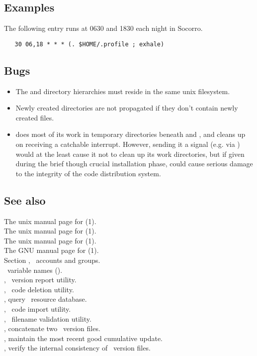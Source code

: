 \subsection*{Examples}

The following   entry runs  at 0630
and 1830 each night in Socorro.

\begin{verbatim}
   30 06,18 * * * (. $HOME/.profile ; exhale)
\end{verbatim}

\subsection*{Bugs}

\begin{itemize}
\item
The  and  directory hierarchies must reside in the
same unix filesystem.

\item
Newly created directories are not propagated if they don't contain newly
created files.

\item
{} does most of its work in temporary directories beneath
 and , and cleans up on receiving a
catchable interrupt.  However, sending it a  signal (e.g. via
) would at the least cause it not to clean up its work
directories, but if given during the brief though crucial installation phase,
could cause serious damage to the integrity of the code distribution system.
\end{itemize}

\subsection*{See also}

The unix manual page for (1).\\
The unix manual page for (1).\\
The unix manual page for (1).\\
The GNU manual page for (1).\\
Section , \aipspp\ accounts and groups.\\
\aipspp\ variable names ().\\
, \aipspp\ version report utility.\\
, \aipspp\ code deletion utility.\\
, query \aipspp\ resource database.\\
, \aipspp\ code import utility.\\
, \aipspp\ filename validation utility.\\
, concatenate two \rcs\ version files.\\
, maintain the most recent good cumulative update.\\
, verify the internal consistency of \rcs\ version files.

